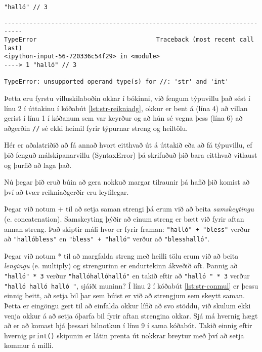 \begin{lstlisting}[caption=Strengir og reikniaðgerðir, label=lst:str-reikniadg]
"halló" // 3
\end{lstlisting}
\lstset{style=uttak}
\begin{lstlisting}
---------------------------------------------------------------------------
TypeError                                 Traceback (most recent call last)
<ipython-input-56-720336c54f29> in <module>
----> 1 "halló" // 3

TypeError: unsupported operand type(s) for //: 'str' and 'int'
\end{lstlisting}
\lstset{style=venjulegt}

Þetta eru fyrstu villuskilaboðin okkar í bókinni, við fengum týpuvillu það sést í línu 2 í úttakinu í kóðabút \ref{lst:str-reikniadg}, okkur er bent á (lína 4) að villan gerist í línu 1 í kóðanum sem var keyrður og að hún sé vegna þess (lína 6) að aðgerðin \texttt{//} sé ekki heimil fyrir týpurnar streng og heiltölu.

Hér er aðalatriðið að fá annað hvort eitthvað út á úttakið eða að fá týpuvillu, ef þið fenguð málskipanarvillu (SyntaxError) þá skrifuðuð þið bara eitthvað vitlaust og þurfið að laga það.


Nú þegar þið eruð búin að gera nokkuð margar tilraunir þá hafið þið komist að því að tvær reikniaðgerðir eru leyfilegar.

Þegar við notum + til að setja saman strengi þá erum við að beita \textit{samskeytingu} (e. concatenation).
Samskeyting þýðir að einum streng er bætt við fyrir aftan annan streng.
Það skiptir máli hvor er fyrir framan: \texttt{"halló" + "bless"} verður að \texttt{"hallóbless"} en \texttt{"bless" + "halló"} verður að \texttt{"blesshalló"}.

Þegar við notum * til að margfalda streng með heilli tölu erum við að beita \emph{lengingu} (e. multiply) og strengurinn er endurtekinn ákveðið oft.
Þannig að \texttt{"halló" * 3} verður \texttt{"hallóhallóhalló"} en takið eftir að \texttt{"halló " * 3} verður \texttt{"halló halló halló "}, sjáiði muninn?
Í línu 2 í kóðabút \ref{lst:str-conmul} er þessu einnig beitt, að setja bil þar sem búist er við að strengjum sem skeytt saman.
Þetta er eingöngu gert til að einfalda okkur lífið að svo stöddu, við skulum ekki venja okkur á að setja óþarfa bil fyrir aftan strengina okkar.
Sjá má hvernig hægt að er að komast hjá þessari bilnotkun í línu 9 í sama kóðabút.
Takið einnig eftir hvernig \texttt{print()} skipunin er látin prenta út nokkrar breytur með því að setja kommur á milli.

